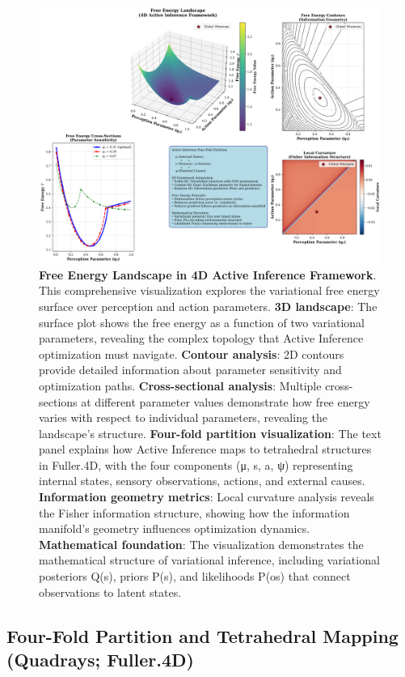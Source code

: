 \documentclass[
  10pt,
]{article}
\begin{document}
\begin{figure}
\centering
\includegraphics{../output/figures/figure_14_free_energy_landscape.png}
\caption{\textbf{Free Energy Landscape in 4D Active Inference
Framework}. This comprehensive visualization explores the variational
free energy surface over perception and action parameters. \textbf{3D
landscape}: The surface plot shows the free energy as a function of two
variational parameters, revealing the complex topology that Active
Inference optimization must navigate. \textbf{Contour analysis}: 2D
contours provide detailed information about parameter sensitivity and
optimization paths. \textbf{Cross-sectional analysis}: Multiple
cross-sections at different parameter values demonstrate how free energy
varies with respect to individual parameters, revealing the landscape's
structure. \textbf{Four-fold partition visualization}: The text panel
explains how Active Inference maps to tetrahedral structures in
Fuller.4D, with the four components (μ, s, a, ψ) representing internal
states, sensory observations, actions, and external causes.
\textbf{Information geometry metrics}: Local curvature analysis reveals
the Fisher information structure, showing how the information manifold's
geometry influences optimization dynamics. \textbf{Mathematical
foundation}: The visualization demonstrates the mathematical structure
of variational inference, including variational posteriors Q(s), priors
P(s), and likelihoods P(o\textbar s) that connect observations to latent
states.}
\end{figure}

\hypertarget{four-fold-partition-and-tetrahedral-mapping-quadrays-fuller.4d}{%
\subsection{Four-Fold Partition and Tetrahedral Mapping (Quadrays;
Fuller.4D)}\label{four-fold-partition-and-tetrahedral-mapping-quadrays-fuller.4d}}
\end{document}
